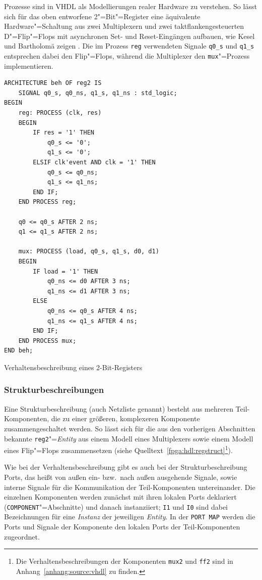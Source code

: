 Prozesse sind in VHDL als Modellierungen realer Hardware zu verstehen. So lässt
sich für das oben entworfene 2"=Bit"=Register eine äquivalente
Hardware"=Schaltung aus zwei Multiplexern und zwei taktflankengesteuerten
D"=Flip"=Flops mit asynchronen Set- und Reset-Eingängen aufbauen, wie Kesel und
Bartholomä zeigen \cite[siehe][32]{kesel2013}. Die im Prozess \texttt{reg}
verwendeten Signale \texttt{q0\_s} und \texttt{q1\_s} entsprechen dabei den
Flip"=Flops, während die Multiplexer den \texttt{mux}"=Prozess implementieren.
\cite[vgl.][31]{kesel2013}


\begin{code}
    \begin{verbatim}
ARCHITECTURE beh OF reg2 IS
    SIGNAL q0_s, q0_ns, q1_s, q1_ns : std_logic;
BEGIN
    reg: PROCESS (clk, res)
    BEGIN
        IF res = '1' THEN
            q0_s <= '0';
            q1_s <= '0';
        ELSIF clk'event AND clk = '1' THEN
            q0_s <= q0_ns;
            q1_s <= q1_ns;
        END IF;
    END PROCESS reg;

    q0 <= q0_s AFTER 2 ns;
    q1 <= q1_s AFTER 2 ns;

    mux: PROCESS (load, q0_s, q1_s, d0, d1)
    BEGIN
        IF load = '1' THEN
            q0_ns <= d0 AFTER 3 ns;
            q1_ns <= d1 AFTER 3 ns;
        ELSE
            q0_ns <= q0_s AFTER 4 ns;
            q1_ns <= q1_s AFTER 4 ns;
        END IF;
    END PROCESS mux;
END beh;
    \end{verbatim}
    \caption{Verhaltensbeschreibung eines 2-Bit-Registers \cite[siehe][28]{kesel2013}}
    \label{fpga:hdl:regbeh}
\end{code}

\subsubsection{Strukturbeschreibungen}

Eine Strukturbeschreibung (auch Netzliste genannt) besteht aus mehreren
Teil-Komponenten, die zu einer größeren, komplexeren Komponente 
zusammengeschaltet werden. So lässt sich für die aus den vorherigen Abschnitten
bekannte \texttt{reg2}"=\textit{Entity} aus einem Modell eines Multiplexers
sowie einem Modell eines Flip"=Flops zusammensetzen (siehe
Quelltext~\ref{fpga:hdl:regstruct}\footnote{Die Verhaltensbeschreibungen der
Komponenten \texttt{mux2} und \texttt{ff2} sind in
Anhang~\ref{anhang:source:vhdl} zu finden.}).

Wie bei der Verhaltensbeschreibung gibt es auch bei der Strukturbeschreibung
Ports, das heißt von außen ein- bzw.\ nach außen ausgehende Signale, sowie
interne Signale für die Kommunikation der Teil-Komponenten untereinander. Die
einzelnen Komponenten werden zunächst mit ihren lokalen Ports deklariert
(\texttt{COMPONENT}"=Abschnitte) und danach instanziiert; \texttt{I1} und
\texttt{I0} sind dabei Bezeichnungen für eine \textit{Instanz} der jeweiligen
\textit{Entity}. In der \texttt{PORT MAP} werden die Ports und Signale der
Komponente den lokalen Ports der Teil-Komponenten zugeordnet.
\cite[vgl.][37]{kesel2013}

